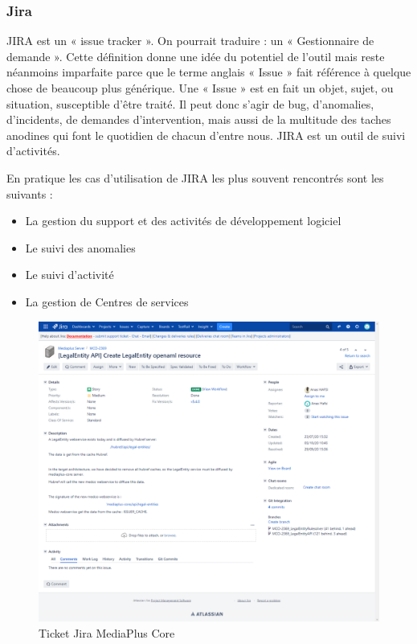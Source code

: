 \subsubsection{Jira}
\par JIRA est un « issue tracker ». On pourrait traduire : un « Gestionnaire de demande ». Cette définition donne une idée du potentiel de l’outil mais reste néanmoins imparfaite parce que le terme anglais « Issue » fait référence à quelque chose de beaucoup plus générique. Une « Issue » est en fait un objet, sujet, ou situation, susceptible d’être traité. Il peut donc s’agir de bug, d’anomalies, d’incidents, de demandes d’intervention, mais aussi de la multitude des taches anodines qui font le quotidien de chacun d’entre nous. JIRA est un outil de suivi d’activités.
\clearpage
\par En pratique les cas d’utilisation de JIRA les plus souvent rencontrés sont les suivants :
\begin{itemize}
    \item La gestion du support et des activités de développement logiciel
    \item Le suivi des anomalies
    \item Le suivi d’activité
    \item La gestion de Centres de services
\end{itemize}
\begin{figure}[ht]
    \centering
    \includegraphics[width=\columnwidth]{img/JIRA MCO-2369.png}
    \caption{Ticket Jira MediaPlus Core}
    \label{fig:JiraMedco}
\end{figure}

